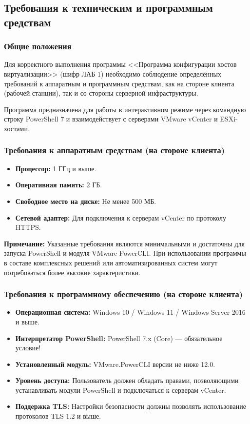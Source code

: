 \subsection{Требования к техническим и программным средствам}

\subsubsection{Общие положения}
Для корректного выполнения программы <<Программа конфигурации хостов виртуализации>> (шифр ЛАБ 1) необходимо соблюдение определённых требований к аппаратным и программным средствам, как на стороне клиента (рабочей станции), так и со стороны серверной инфраструктуры.

Программа предназначена для работы в интерактивном режиме через командную строку PowerShell 7 и взаимодействует с серверами VMware vCenter и ESXi-хостами.

\subsubsection{Требования к аппаратным средствам (на стороне клиента)}
\begin{itemize}
    \item \textbf{Процессор:} 1 ГГц и выше.
    \item \textbf{Оперативная память:} 2 ГБ.
    \item \textbf{Свободное место на диске:} Не менее 500 МБ.
    \item \textbf{Сетевой адаптер:} Для подключения к серверам vCenter по протоколу HTTPS.
\end{itemize}

\textbf{Примечание:} Указанные требования являются минимальными и достаточны для запуска PowerShell и модуля VMware PowerCLI. При использовании программы в составе комплексных решений или автоматизированных систем могут потребоваться более высокие характеристики.

\subsubsection{Требования к программному обеспечению (на стороне клиента)}
\begin{itemize}
    \item \textbf{Операционная система:} Windows 10 / Windows 11 / Windows Server 2016 и выше.
    \item \textbf{Интерпретатор PowerShell:} PowerShell 7.x (Core) — обязательное условие!
    \item \textbf{Установленный модуль:} VMware.PowerCLI версии не ниже 12.0.
    \item \textbf{Уровень доступа:} Пользователь должен обладать правами, позволяющими устанавливать модули PowerShell и подключаться к серверам vCenter.
    \item \textbf{Поддержка TLS:} Настройки безопасности должны позволять использование протоколов TLS 1.2 и выше.
\end{itemize}

